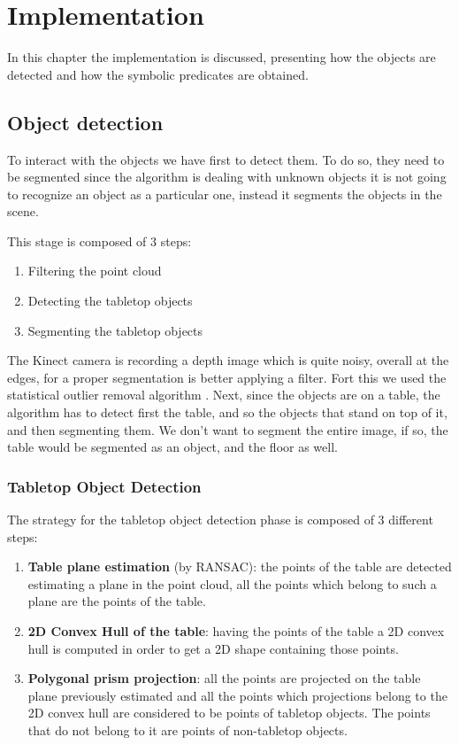 \chapter{Implementation}
\label{ch:implementation}

In this chapter the implementation is discussed, presenting how the objects are detected and how the symbolic predicates are obtained. 

\section{Object detection} 

To interact with the objects we have first to detect them. To do so, they need to be segmented since the algorithm is dealing with unknown objects it is not going to recognize an object as a particular one, instead it segments the objects in the scene. 

This stage is composed of 3 steps:
\begin{enumerate}
\item Filtering the point cloud
\item Detecting the tabletop objects
\item Segmenting the tabletop objects
\end{enumerate}
The Kinect camera is recording a depth image which is quite noisy, overall at the edges, for a proper segmentation is better applying a filter. Fort this we used the statistical outlier removal algorithm \citep{rusu2008towards}.	
Next, since the objects are on a table, the algorithm has to detect first the table, and so the objects that stand on top of it, and then segmenting them. We don't want to segment the entire image, if so, the table would be segmented as an object, and the floor as well.

\subsection{Tabletop Object Detection} 
The strategy for the tabletop object detection phase is composed of 3 different steps:
\begin{enumerate}
\item \textbf{Table plane estimation} (by RANSAC): the points of the table are detected estimating a plane in the point cloud, all the points which belong to such a plane are the points of the table. 
\item \textbf{2D Convex Hull of the table}: having the points of the table a 2D convex hull is computed in order to get a 2D shape containing those points.
\item \textbf{Polygonal prism projection}: all the points are projected on the table plane previously estimated and all the points which projections belong to the 2D convex hull are considered to be points of tabletop objects. The points that do not belong to it are points of non-tabletop objects.
\end{enumerate}


